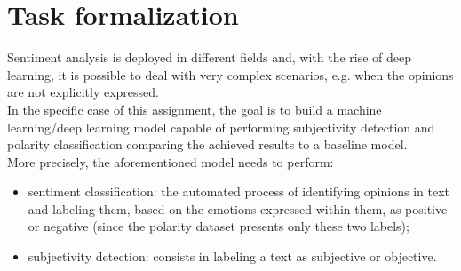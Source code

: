 
\vspace{-0.5cm}
\section{Task formalization}
Sentiment analysis is deployed in different fields %
and, with the rise of deep learning, it is possible to deal with very complex scenarios, e.g. when the opinions are not explicitly expressed.\\
In the specific case of this assignment, the goal is to build a machine learning/deep learning model capable of performing subjectivity detection and polarity classification 
comparing the achieved results to a baseline model.\\
More precisely, the aforementioned model needs to perform:
\begin{itemize}
    \item sentiment classification: the automated process of identifying opinions in text and labeling them, based on the emotions expressed within them,
        as positive or negative (since the polarity dataset \textbf{} presents only these two labels); 
    \item subjectivity detection: consists in labeling a text as subjective or objective.
\end{itemize}


